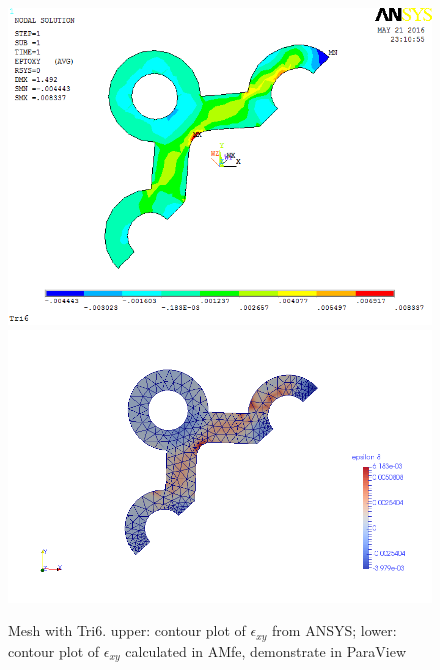 \begin{figure}[htbp]
	\begin{center}
		\includegraphics[width=13cm,clip]{Tri6_Exy.png} 		
		\includegraphics[width=13cm,clip]{Tri6_Exy_P.png} 		
		\caption{Mesh with Tri6. upper: contour plot of $\epsilon_{xy}$ from ANSYS; lower: contour plot of $\epsilon_{xy}$ calculated in AMfe, demonstrate in ParaView} \label{fig: Tri6_Exy}
	\end{center}
\end{figure}
\clearpage 

